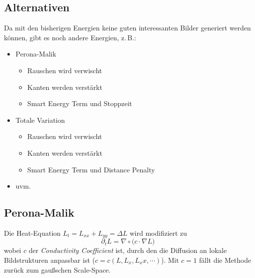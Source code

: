 			\subsection{Alternativen}
				Da mit den bisherigen Energien keine guten interessanten Bilder generiert werden können, gibt es noch andere Energien, z.\,B.:
				\begin{itemize}
					\item Perona-Malik
						\begin{itemize}
							\item Rauschen wird verwischt
							\item Kanten werden verstärkt
							\item Smart Energy Term und Stoppzeit
						\end{itemize}
					\item Totale Variation
						\begin{itemize}
							\item Rauschen wird verwischt
							\item Kanten werden verstärkt
							\item Smart Energy Term und Distance Penalty
						\end{itemize}
					\item uvm.
				\end{itemize}

			\subsection{Perona-Malik}
				Die Heat-Equation \( L_t = L_{xx} + L_{yy} = \Delta L \) wird modifiziert zu
				\begin{equation*}
					\partial_t L = \nabla \circ \big( c \cdot \nabla L \big)
				\end{equation*}
				wobei \(c\) der \emph{Conductivity Coefficient} ist, durch den die Diffusion an lokale Bildstrukturen anpassbar ist (\dh \( c = c(L, L_x, L_xx, \cdots) \)). Mit \( c = 1 \) fällt die Methode zurück zum gaußschen Scale-Space.


